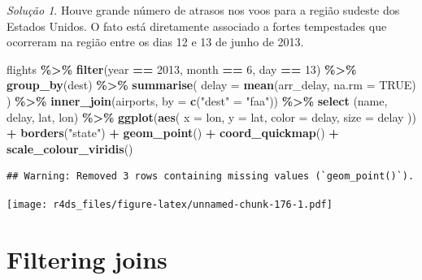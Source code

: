 \documentclass[
]{latex/krantz}
\newenvironment{Shaded}{\begin{snugshade}}{\end{snugshade}}
\newcommand{\AttributeTok}[1]{\textcolor[rgb]{0.13,0.29,0.53}{#1}}
\newcommand{\ConstantTok}[1]{\textcolor[rgb]{0.56,0.35,0.01}{#1}}
\newcommand{\DecValTok}[1]{\textcolor[rgb]{0.00,0.00,0.81}{#1}}
\newcommand{\FunctionTok}[1]{\textcolor[rgb]{0.13,0.29,0.53}{\textbf{#1}}}
\newcommand{\NormalTok}[1]{#1}
\newcommand{\OtherTok}[1]{\textcolor[rgb]{0.56,0.35,0.01}{#1}}
\newcommand{\SpecialCharTok}[1]{\textcolor[rgb]{0.81,0.36,0.00}{\textbf{#1}}}
\newcommand{\StringTok}[1]{\textcolor[rgb]{0.31,0.60,0.02}{#1}}
\theoremstyle{definition}
\theoremstyle{definition}
\theoremstyle{definition}
\theoremstyle{definition}
\theoremstyle{remark}
\newtheorem*{solution}{Solução}
\begin{document}
\begin{solution}
Houve grande número de atrasos nos voos para a região sudeste dos Estados Unidos. O fato está diretamente associado a fortes tempestades que ocorreram na região entre os dias 12 e 13 de junho de 2013.

\begin{Shaded}
\begin{Highlighting}[]
\NormalTok{flights }\SpecialCharTok{\%\textgreater{}\%}
  \FunctionTok{filter}\NormalTok{(year }\SpecialCharTok{==} \DecValTok{2013}\NormalTok{, month }\SpecialCharTok{==} \DecValTok{6}\NormalTok{, day }\SpecialCharTok{==} \DecValTok{13}\NormalTok{) }\SpecialCharTok{\%\textgreater{}\%}
  \FunctionTok{group\_by}\NormalTok{(dest) }\SpecialCharTok{\%\textgreater{}\%}
  \FunctionTok{summarise}\NormalTok{(}
    \AttributeTok{delay =} \FunctionTok{mean}\NormalTok{(arr\_delay, }\AttributeTok{na.rm =} \ConstantTok{TRUE}\NormalTok{)}
\NormalTok{  ) }\SpecialCharTok{\%\textgreater{}\%}
  \FunctionTok{inner\_join}\NormalTok{(airports, }\AttributeTok{by =} \FunctionTok{c}\NormalTok{(}\StringTok{"dest"} \OtherTok{=} \StringTok{"faa"}\NormalTok{)) }\SpecialCharTok{\%\textgreater{}\%}
  \FunctionTok{select}\NormalTok{ (name, delay, lat, lon) }\SpecialCharTok{\%\textgreater{}\%}
  \FunctionTok{ggplot}\NormalTok{(}\FunctionTok{aes}\NormalTok{(}
      \AttributeTok{x =}\NormalTok{ lon, }
      \AttributeTok{y =}\NormalTok{ lat,}
      \AttributeTok{color =}\NormalTok{ delay,}
      \AttributeTok{size =}\NormalTok{ delay}
\NormalTok{  )) }\SpecialCharTok{+}
    \FunctionTok{borders}\NormalTok{(}\StringTok{"state"}\NormalTok{) }\SpecialCharTok{+} 
    \FunctionTok{geom\_point}\NormalTok{() }\SpecialCharTok{+}
    \FunctionTok{coord\_quickmap}\NormalTok{()  }\SpecialCharTok{+}
    \FunctionTok{scale\_colour\_viridis}\NormalTok{()}
\end{Highlighting}
\end{Shaded}

\begin{verbatim}
## Warning: Removed 3 rows containing missing values (`geom_point()`).
\end{verbatim}

\texttt{[image: r4ds\_files/figure-latex/unnamed-chunk-176-1.pdf]}
\end{solution}

\hypertarget{filtering-joins}{%
\section{Filtering joins}\label{filtering-joins}}
\end{document}
